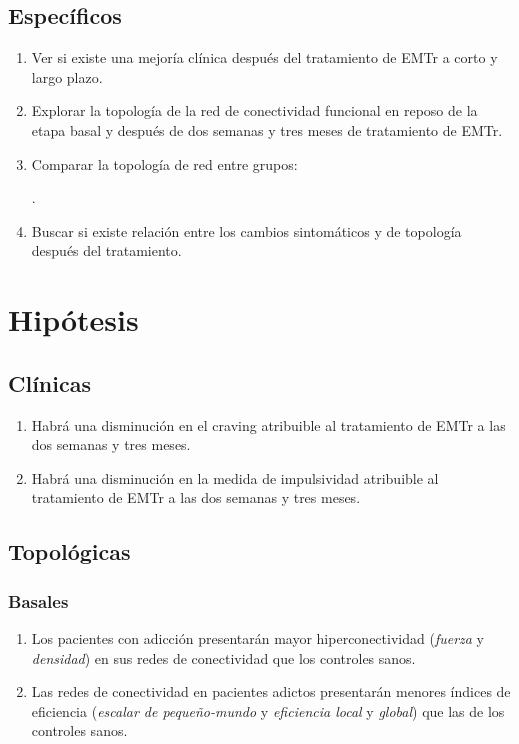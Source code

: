 \subsection{Específicos}
\begin{enumerate}[label=Específico \arabic*., left= \parindent]
    \item Ver si existe una mejoría clínica después del tratamiento de EMTr a corto y largo plazo.
    \item Explorar la topología de la red de conectividad funcional en reposo de la etapa basal y después de dos semanas y tres meses de tratamiento de EMTr.
    \item Comparar la topología de red entre grupos: .
    \item Buscar si existe relación entre los cambios sintomáticos y de topología después del tratamiento.
\end{enumerate}

\section{Hipótesis}
\subsection{Clínicas}
\begin{enumerate}[label=Hipótesis \arabic*., left= \parindent]
    \item Habrá una disminución en el craving atribuible al tratamiento de EMTr a las dos semanas y tres meses.
    \item Habrá una disminución en la medida de impulsividad atribuible al tratamiento de EMTr a las dos semanas y tres meses.
\end{enumerate}
\subsection{Topológicas}
    \subsubsection{Basales}
    \begin{enumerate}[resume,label=Hipótesis \arabic*., left= \parindent]
        \item Los pacientes con adicción presentarán mayor hiperconectividad (\emph{fuerza} y \emph{densidad}) en sus redes de conectividad que los controles sanos.
        \item Las redes de conectividad en pacientes adictos presentarán menores índices de eficiencia (\emph{escalar de pequeño-mundo} y \emph{eficiencia local} y \emph{global}) que las de los controles sanos.
    \end{enumerate}
